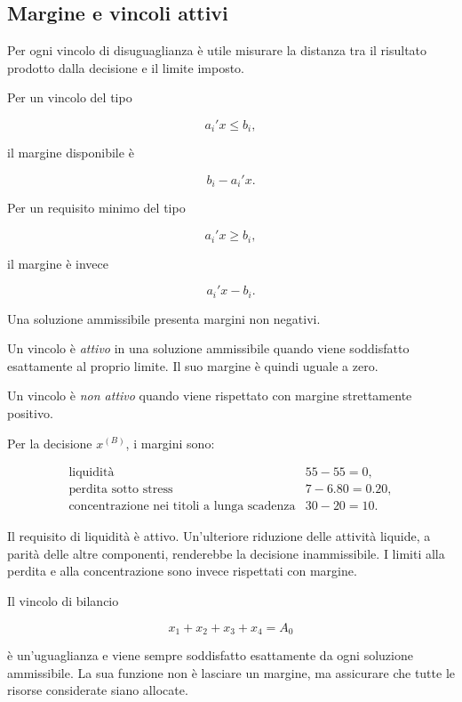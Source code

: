 \subsection{Margine e vincoli attivi}

Per ogni vincolo di disuguaglianza \`e utile misurare la distanza tra il
risultato prodotto dalla decisione e il limite imposto.

Per un vincolo del tipo

\[
a_i'x\leq b_i,
\]

\noindent il margine disponibile \`e

\[
b_i-a_i'x.
\]

Per un requisito minimo del tipo

\[
a_i'x\geq b_i,
\]

\noindent il margine \`e invece

\[
a_i'x-b_i.
\]

Una soluzione ammissibile presenta margini non negativi.

\begin{definition}

Un vincolo \`e \emph{attivo} in una soluzione ammissibile quando viene
soddisfatto esattamente al proprio limite. Il suo margine \`e quindi uguale
a zero.

Un vincolo \`e \emph{non attivo} quando viene rispettato con margine
strettamente positivo.

\end{definition}

Per la decisione \(x^{(B)}\), i margini sono:

\[
\begin{array}{ll}
\text{liquidit\`a}
&
55-55=0,
\\[4pt]
\text{perdita sotto stress}
&
7-6.80=0.20,
\\[4pt]
\text{concentrazione nei titoli a lunga scadenza}
&
30-20=10.
\end{array}
\]

Il requisito di liquidit\`a \`e attivo. Un'ulteriore riduzione delle
attivit\`a liquide, a parit\`a delle altre componenti, renderebbe la decisione
inammissibile. I limiti alla perdita e alla concentrazione sono invece
rispettati con margine.

Il vincolo di bilancio

\[
x_1+x_2+x_3+x_4=A_0
\]

\noindent \`e un'uguaglianza e viene sempre soddisfatto esattamente da ogni soluzione
ammissibile. La sua funzione non \`e lasciare un margine, ma assicurare che
tutte le risorse considerate siano allocate.

